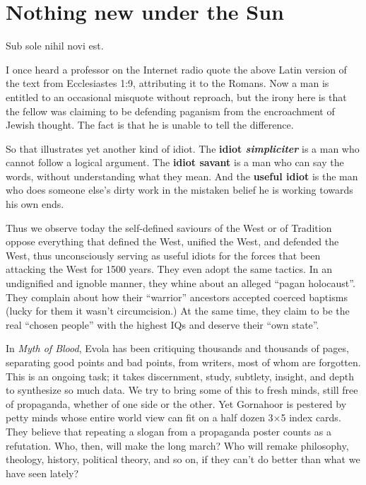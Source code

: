 \section{Nothing new under the Sun}

\begin{quotex}
Sub sole nihil novi est.
\end{quotex}

I once heard a professor on the Internet radio quote the above Latin version of the text from Ecclesiastes 1:9, attributing it to the Romans. Now a man is entitled to an occasional misquote without reproach, but the irony here is that the fellow was claiming to be defending paganism from the encroachment of Jewish thought. The fact is that he is unable to tell the difference.

So that illustrates yet another kind of idiot. The \textbf{idiot \emph{simpliciter}} is a man who cannot follow a logical argument. The \textbf{idiot savant} is a man who can say the words, without understanding what they mean. And the \textbf{useful idiot} is the man who does someone else's dirty work in the mistaken belief he is working towards his own ends.

Thus we observe today the self-defined saviours of the West or of Tradition oppose everything that defined the West, unified the West, and defended the West, thus unconsciously serving as useful idiots for the forces that been attacking the West for 1500 years. They even adopt the same tactics. In an undignified and ignoble manner, they whine about an alleged ``pagan holocaust''. They complain about how their ``warrior'' ancestors accepted coerced baptisms (lucky for them it wasn't circumcision.) At the same time, they claim to be the real ``chosen people'' with the highest IQs and deserve their ``own state''.


In \textit{Myth of Blood}, Evola has been critiquing thousands and thousands of pages, separating good points and bad points, from writers, most of whom are forgotten. This is an ongoing task; it takes discernment, study, subtlety, insight, and depth to synthesize so much data. We try to bring some of this to fresh minds, still free of propaganda, whether of one side or the other. Yet Gornahoor is pestered by petty minds whose entire world view can fit on a half dozen 3×5 index cards. They believe that repeating a slogan from a propaganda poster counts as a refutation. Who, then, will make the long march? Who will remake philosophy, theology, history, political theory, and so on, if they can't do better than what we have seen lately?

